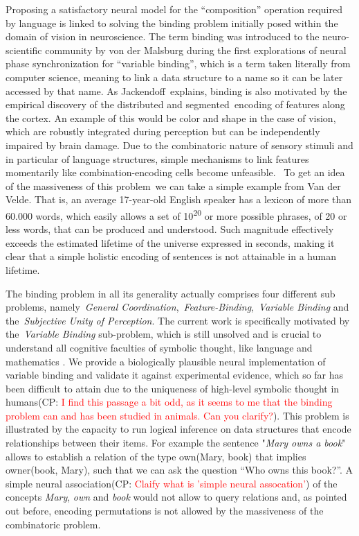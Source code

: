 \documentclass[10pt]{article}
\newcommand{\noteCP}[1]{(CP: \textcolor{red}{#1})}
\begin{document}
Proposing a satisfactory neural model for the ``composition''
operation required by language is linked to solving the binding
problem initially posed within the domain of vision in neuroscience.
The term binding was introduced to the neuro-scientific community by
von der Malsburg\cite{von_der_Malsburg_1994} during the first
explorations of neural phase synchronization for ``variable binding'',
which is a term taken literally from computer science, meaning to link
a data structure to a name so it can be later accessed by that name.
As Jackendoff\cite{Jackendoff_2002b}~explains, binding is also
motivated by the empirical discovery of the distributed and
segmented~encoding of features along the cortex. An example of this
would be color and shape in the case of vision, which are robustly
integrated during perception but can be independently impaired by
brain damage. Due to the combinatoric nature of sensory stimuli and in
particular of language structures, simple mechanisms to link features
momentarily like combination-encoding cells become
unfeasible\cite{von_der_Malsburg_1999}. ~To get an idea of the
massiveness of this problem~we can take a simple example from Van der
Velde\cite{van_der_Velde_2006}. That is, an average 17-year-old
English speaker has a lexicon of more than 60.000 words, which easily
allows a set of 10\textsuperscript{20} or more possible phrases, of 20
or less words, that can be produced and understood. Such magnitude
effectively exceeds the estimated lifetime of the universe expressed
in seconds, making it clear that a simple holistic encoding of
sentences is not attainable in a human lifetime.

The binding problem in all its generality actually comprises four
different sub problems, namely~\emph{General
  Coordination},~\emph{Feature-Binding},~\emph{Variable Binding} and
the~\emph{Subjective Unity of Perception}\cite{Feldman_2012}. The
current work is specifically motivated by the~\emph{Variable Binding}
sub-problem, which is still unsolved and is crucial to understand all
cognitive faculties of symbolic thought, like language and mathematics
\cite{marcus01,smolensky2006harmonic}. We provide
a biologically plausible neural implementation of variable binding and
validate it against experimental evidence, which so far has been
difficult to attain due to the uniqueness of high-level symbolic
thought in humans\noteCP{I find this passage a bit odd, as it seems to
  me that the binding problem can and has been studied in animals. Can
  you clarify?}. This problem is illustrated by the capacity to run
logical inference on data structures that encode relationships between
their items. For example the sentence "\emph{Mary owns a book}" allows
to establish a relation of the type own(Mary, book) that implies
owner(book, Mary), such that we can ask the question ``Who owns this
book?''. A simple neural association\noteCP{Claify what is 'simple
  neural assocation'} of the concepts \emph{Mary}, \emph{own} and
\emph{book} would not allow to query relations and, as pointed out
before, encoding permutations is not allowed by the massiveness of the
combinatoric problem.
\end{document}
